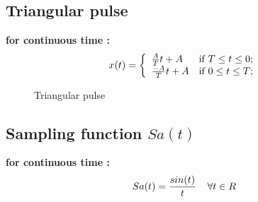\documentclass[a4paper,12pt]{book}
\begin{document}
\subsection*{Triangular pulse}
{\bf for continuous time :}\\
	\[ x(t) = \left\{ \begin{array}{ll}

	\frac{A}{T}t+A & \mbox{if $ T \leq t \leq 0$;} \\

	\frac{-A}{T}t+A & \mbox{if $0 \leq t \leq T$;} \\

	\end{array}
	\right. \]
\begin{figure}[h]  
\centering 
{}
\caption{Triangular pulse} \label{fig:M}  
\end{figure}

\subsection*{Sampling function $Sa(t)$}
{\bf for continuous time :}\\
	$$Sa(t) =\frac{sin(t)}{t} \hspace{4mm}\forall t \in R $$
\bigskip\\
\end{document}
